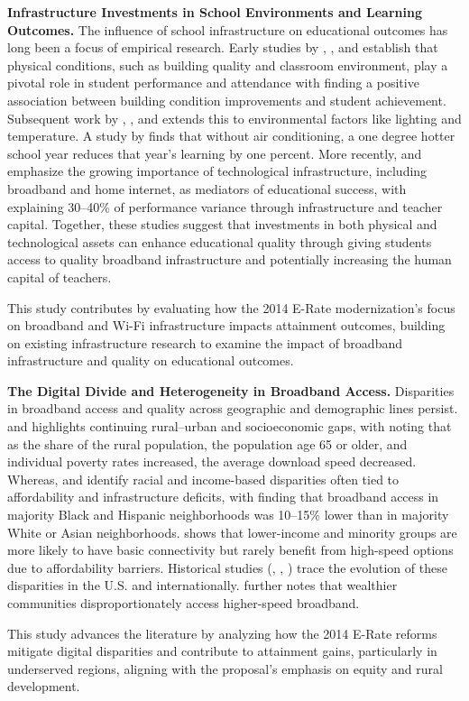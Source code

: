 \textbf{Infrastructure Investments in School Environments and Learning Outcomes.}  The influence of school infrastructure on educational outcomes has long been a focus of empirical research. Early studies by \citet{berner1993}, \citet{cash1993}, and \citet{duran2008} establish that physical conditions, such as building quality and classroom environment, play a pivotal role in student performance and attendance with \citet{berner1993} finding a positive association between building condition improvements and student achievement.  Subsequent work by \citet{maxwell1999}, \citet{hathaway1995}, and \citet{park2020} extends this to environmental factors like lighting and temperature. A study by \citet{park2020} finds that without air conditioning, a one degree hotter school year reduces that year’s learning by one percent. More recently, \citet{wanke2024} and \citet{daoud2021} emphasize the growing importance of technological infrastructure, including broadband and home internet, as mediators of educational success, with \citet{wanke2024} explaining 30–40\% of performance variance through infrastructure and teacher capital. Together, these studies suggest that investments in both physical and technological assets can enhance educational quality through giving students access to quality broadband infrastructure and potentially increasing the human capital of teachers.

This study contributes by evaluating how the 2014 E-Rate modernization’s focus on broadband and Wi-Fi infrastructure impacts attainment outcomes, building on existing infrastructure research to examine the impact of broadband infrastructure and quality on educational outcomes.

\textbf{The Digital Divide and Heterogeneity in Broadband Access.}  Disparities in broadband access and quality across geographic and demographic lines persist. \citet{gallardo2022} and \citet{gallardo2024} highlights continuing rural–urban and socioeconomic gaps, with \citet{gallardo2024} noting that as the share of the rural population, the population age 65 or older, and individual poverty rates increased, the average download speed decreased. Whereas, \citet{li2023} and \citet{reddick2020} identify racial and income-based disparities often tied to affordability and infrastructure deficits, with \citet{li2023} finding that broadband access in majority Black and Hispanic neighborhoods was 10–15\% lower than in majority White or Asian neighborhoods. \citet{reddick2020} shows that lower-income and minority groups are more likely to have basic connectivity but rarely benefit from high-speed options due to affordability barriers. Historical studies (\citet{strover2001}, \citet{riddlesden2014},  \citet{kelley2020}) trace the evolution of these disparities in the U.S. and internationally. \citet{boeri2023} further notes that wealthier communities disproportionately access higher-speed broadband. 

This study advances the literature by analyzing how the 2014 E-Rate reforms mitigate digital disparities and contribute to attainment gains, particularly in underserved regions, aligning with the proposal’s emphasis on equity and rural development.




